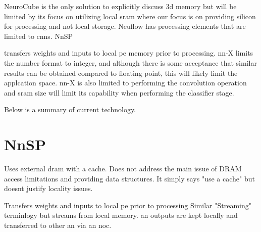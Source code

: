 {{%
\iffalse
\begin{figure}
\centering
\begin{subfigure}{.45\textwidth}
  \centering
  \texttt{[image: kim2016neurocube\_fig4]}
  \captionsetup{justification=centering, skip=6pt}
  \caption{NeuroCube}
  \label{fig:NeuroCubeDie}
\end{subfigure}%
\begin{subfigure}{.45\textwidth}
  \centering
  \texttt{[image: chen2014diannao\_fig15]}
  \captionsetup{justification=centering, skip=10pt}
  \caption{Diannao (SB and NBx are \ac{sram})}
  \label{fig:DiannaoDie}
\end{subfigure}
\captionsetup{justification=centering, skip=3pt}
\caption{Example state-of-the-art die}
\label{fig:Example state-of-the-art die}
\end{figure}
\fi


\iftrue

NeuroCube\cite{kim2016neurocube} is the only solution to explicitly discuss \ac{3d} memory but will be limited by its focus on utilizing local \ac{sram} where our focus is on
providing silicon for processing and not local storage.
Neuflow\cite{farabet2011neuflow} has processing elements that are limited to \acp{cnn}.
NnSP{\cite{esmaeilzadeh2005nnsp} transfers weights and inputs to local \ac{pe} memory prior to processing.
nn-X\cite{gokhale2014240} limits the number format to integer, and although there is some acceptance that similar
results can be obtained compared to floating point, this will likely limit the applcation space. 
nn-X is also limited to performing the convolution operation and \ac{sram} size will limit its capability when performing the classifier stage.

Below is a summary of current technology.

\section[NnSP]{NnSP{\cite{esmaeilzadeh2005nnsp}}}

Uses external \ac{dram} with a cache.
Does not address the main issue of DRAM access limitations and providing data structures.
It simply says "use a cache" but doesnt justify locality issues.

Transfers weights and inputs to local \ac{pe} prior to processing
Similar "Streaming" terminlogy but streams from local memory.
\ac{an} outputs are kept locally and transferred to other \ac{an} via an  \ac{noc}.

}}}

